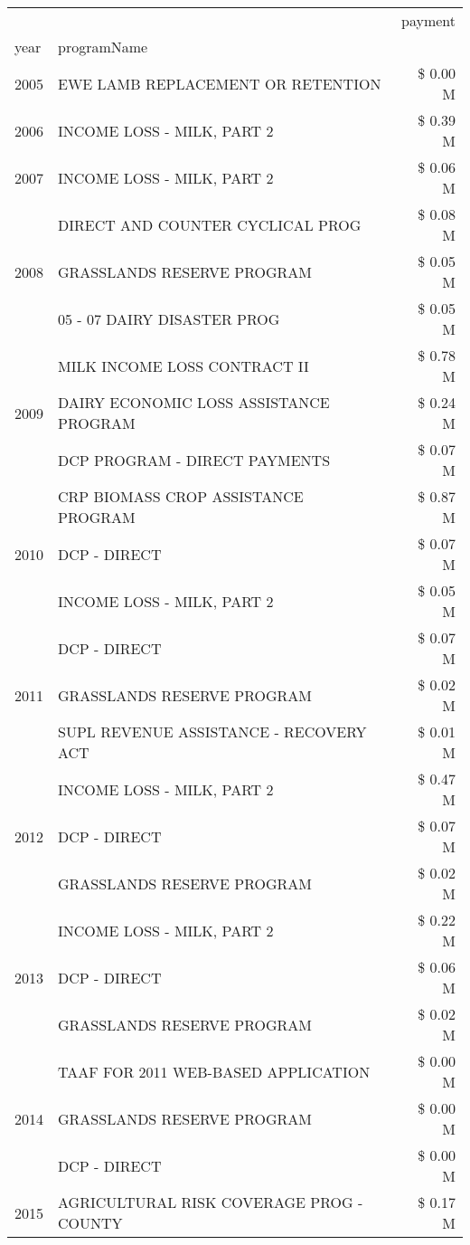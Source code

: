 \begin{tabular}{llr}
\toprule
 &  & payment \\
year & programName &  \\
\midrule
2005 & EWE LAMB REPLACEMENT OR RETENTION & \$ 0.00 M \\
\cline{1-3}
2006 & INCOME LOSS - MILK, PART 2 & \$ 0.39 M \\
\cline{1-3}
2007 & INCOME LOSS - MILK, PART 2 & \$ 0.06 M \\
\cline{1-3}
\multirow[t]{3}{*}{2008} & DIRECT AND COUNTER CYCLICAL PROG & \$ 0.08 M \\
 & GRASSLANDS RESERVE PROGRAM & \$ 0.05 M \\
 & 05 - 07 DAIRY DISASTER PROG & \$ 0.05 M \\
\cline{1-3}
\multirow[t]{3}{*}{2009} & MILK INCOME LOSS CONTRACT II & \$ 0.78 M \\
 & DAIRY ECONOMIC LOSS ASSISTANCE PROGRAM & \$ 0.24 M \\
 & DCP PROGRAM - DIRECT PAYMENTS & \$ 0.07 M \\
\cline{1-3}
\multirow[t]{3}{*}{2010} & CRP BIOMASS CROP ASSISTANCE PROGRAM & \$ 0.87 M \\
 & DCP - DIRECT & \$ 0.07 M \\
 & INCOME LOSS - MILK, PART 2 & \$ 0.05 M \\
\cline{1-3}
\multirow[t]{3}{*}{2011} & DCP - DIRECT & \$ 0.07 M \\
 & GRASSLANDS RESERVE PROGRAM & \$ 0.02 M \\
 & SUPL REVENUE ASSISTANCE - RECOVERY ACT & \$ 0.01 M \\
\cline{1-3}
\multirow[t]{3}{*}{2012} & INCOME LOSS - MILK, PART 2 & \$ 0.47 M \\
 & DCP - DIRECT & \$ 0.07 M \\
 & GRASSLANDS RESERVE PROGRAM & \$ 0.02 M \\
\cline{1-3}
\multirow[t]{3}{*}{2013} & INCOME LOSS - MILK, PART 2 & \$ 0.22 M \\
 & DCP - DIRECT & \$ 0.06 M \\
 & GRASSLANDS RESERVE PROGRAM & \$ 0.02 M \\
\cline{1-3}
\multirow[t]{3}{*}{2014} & TAAF FOR 2011 WEB-BASED APPLICATION & \$ 0.00 M \\
 & GRASSLANDS RESERVE PROGRAM & \$ 0.00 M \\
 & DCP - DIRECT & \$ 0.00 M \\
\cline{1-3}
\multirow[t]{3}{*}{2015} & AGRICULTURAL RISK COVERAGE PROG - COUNTY & \$ 0.17 M \\

\end{tabular}
